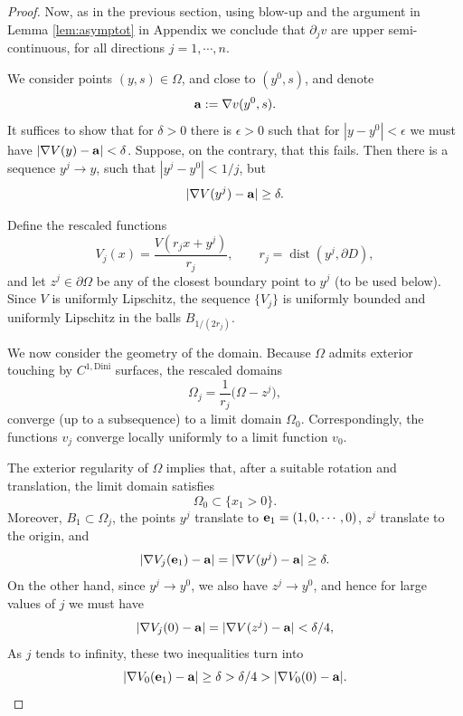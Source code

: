\documentclass[11pt,reqno]{amsart}
\theoremstyle{plain}
\theoremstyle{remark}
\numberwithin{equation}{section}
\begin{document}
\begin{proof}
Now, as in the previous section, using blow-up and the argument in Lemma \ref{lem:asymptot} in Appendix we conclude that $\partial_j v$ are upper semi-continuous, for all directions $j =1, \cdots ,n$.








We   consider points $(y,s) \in \Omega$, and close to $(y^0,s)$, and denote 
$${\bf a} := \nabla v (y^0, s).$$
It suffices to show that  for $\delta >0$ there is $\epsilon >0$ such that for 
$|y-y^0 |< \epsilon $ we must have 
$|\nabla V (y) -{\bf a}| < \delta $.
Suppose, on the contrary, that this fails. Then there is a sequence $y^j \to y$, such that $|y^j - y^0 |< 1/j $, but 
\begin{equation}\label{eq:bigger}
    |\nabla V (y^j) -{\bf a}| \geq  \delta .
\end{equation}







Define the rescaled functions
\[
V_j(x) = \frac{V(r_j x + y^j)}{r_j},
\qquad
r_j = \operatorname{dist}(y^j, \partial D),
\]
and let   $z^j \in \partial \Omega$ be  any of the  closest boundary point to $y^j$ (to be used below).
Since $V$ is uniformly Lipschitz, the sequence $\{V_j\}$ is uniformly bounded and 
uniformly Lipschitz in the balls $B_{1/(2r_j)}$.


We now consider the geometry of the domain. Because $\Omega$ admits exterior touching by $C^{1,\mathrm{Dini}}$ surfaces, the rescaled domains
\[
\Omega_j = \frac{1}{r_j}\bigl(\Omega - z^j\bigr),
\]
 converge (up to a subsequence) to a limit domain $\Omega_0$. Correspondingly, the functions $v_j$ converge locally uniformly to a limit function $v_0$.

The exterior regularity of $\Omega$ implies that, after a suitable rotation and translation, the limit domain satisfies
\begin{equation}\label{eq:omega0}
    \Omega_0 \subset \{x_1 > 0\}.
\end{equation}
Moreover, $B_1 \subset \Omega_j$,  the points 
$y^j$ translate to ${\bf e}_1= (1,0, \cdots , 0)$,  $z^j $ translate  to the origin, 
and 
\[\lvert \nabla V_j({\bf e}_1) - {\bf a} \rvert = 
\lvert \nabla V(y^j) - {\bf a} \rvert \geq \delta.
\]
On the other hand,  since $y^j \to y^0 $, we also have $z^j \to y^0$, and hence for large values of $j$ we must have 
\begin{equation*} 
  |\nabla V_j (0) - {\bf a} | =   |\nabla V (z^j) -{\bf a}| <  \delta/4 ,
\end{equation*}
As $j $ tends to infinity, 
these two inequalities turn into 
\begin{equation} \label{eq:inequalies}
  \lvert \nabla V_0({\bf e}_1) - {\bf a} \rvert \geq  \delta  > \delta/4 > 
  |\nabla V_0 (0) - {\bf a} | .
\end{equation}


\end{proof}
\end{document}
